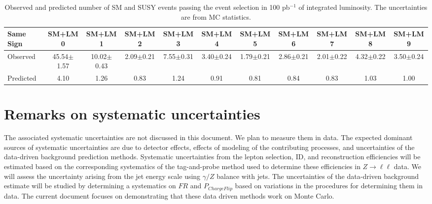 \vspace{0.9mm}
\begin{table}[hbt]
\begin{center}
\renewcommand{\arraystretch}{1.2}
{\footnotesize\addtolength{\tabcolsep}{-4pt} 
\begin{tabular}{|l|c|c|c|c|c|c|c|c|c|c|}\hline
Same Sign & SM+LM0 & SM+LM1 & SM+LM2 & SM+LM3 & SM+LM4 & SM+LM5 & SM+LM6 & SM+LM7 & SM+LM8 & SM+LM9 \\ \hline
Observed & 45.54$\pm$1.57 & 10.02$\pm$0.43 & 2.09$\pm$0.21 & 7.55$\pm$0.31 & 3.40$\pm$0.24 & 1.79$\pm$0.21 & 2.86$\pm$0.21 & 2.01$\pm$0.22 & 4.32$\pm$0.22 & 3.50$\pm$0.24 \\ \hline
Predicted & 4.10 & 1.26 & 0.83 & 1.24 &	0.91 &	0.81 &	0.84 &	0.83 &	1.03 &	1.00 \\ \hline
\end{tabular} }
\caption{Observed and predicted  number of SM and SUSY events passing the event selection in 100 pb$^{-1}$ of integrated
luminosity. The uncertainties are from MC statistics.\label{tab:yieldsSUSY}}
\end{center}
\end{table}

\section{Remarks on systematic uncertainties}
\label{sec:systematics}
The associated systematic uncertainties are not discussed in this document. We plan to measure
them in data. The expected dominant sources of systematic uncertainties 
are due to detector effects, effects 
of modeling of the contributing processes, and uncertainties of the data-driven background 
prediction methods.  Systematic uncertainties from the lepton selection, ID, and reconstruction efficiencies will be
estimated based on the corresponding systematics of the tag-and-probe method used to determine these efficiencies 
in $Z \rightarrow \ell \ell$ data. We will assess the uncertainty arising from the jet energy scale
using $\gamma/Z$ balance with jets. The uncertainties of the data-driven background estimate will be studied 
by determining a systematics on $FR$ and $P_{ChargeFlip}$ based on variations in the procedures for determining them in data.
The current document focuses on demonstrating that these data driven methods work on Monte Carlo.

\clearpage
